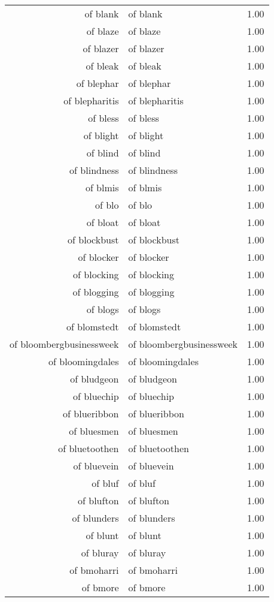 \begin{table}[ht]
\begin{tabular}{rlr}
  of blank & of blank & 1.00 \\ 
  of blaze & of blaze & 1.00 \\ 
  of blazer & of blazer & 1.00 \\ 
  of bleak & of bleak & 1.00 \\ 
  of blephar & of blephar & 1.00 \\ 
  of blepharitis & of blepharitis & 1.00 \\ 
  of bless & of bless & 1.00 \\ 
  of blight & of blight & 1.00 \\ 
  of blind & of blind & 1.00 \\ 
  of blindness & of blindness & 1.00 \\ 
  of blmis & of blmis & 1.00 \\ 
  of blo & of blo & 1.00 \\ 
  of bloat & of bloat & 1.00 \\ 
  of blockbust & of blockbust & 1.00 \\ 
  of blocker & of blocker & 1.00 \\ 
  of blocking & of blocking & 1.00 \\ 
  of blogging & of blogging & 1.00 \\ 
  of blogs & of blogs & 1.00 \\ 
  of blomstedt & of blomstedt & 1.00 \\ 
  of bloombergbusinessweek & of bloombergbusinessweek & 1.00 \\ 
  of bloomingdales & of bloomingdales & 1.00 \\ 
  of bludgeon & of bludgeon & 1.00 \\ 
  of bluechip & of bluechip & 1.00 \\ 
  of blueribbon & of blueribbon & 1.00 \\ 
  of bluesmen & of bluesmen & 1.00 \\ 
  of bluetoothen & of bluetoothen & 1.00 \\ 
  of bluevein & of bluevein & 1.00 \\ 
  of bluf & of bluf & 1.00 \\ 
  of blufton & of blufton & 1.00 \\ 
  of blunders & of blunders & 1.00 \\ 
  of blunt & of blunt & 1.00 \\ 
  of bluray & of bluray & 1.00 \\ 
  of bmoharri & of bmoharri & 1.00 \\ 
  of bmore & of bmore & 1.00 \\ 

\end{tabular}
\end{table}
